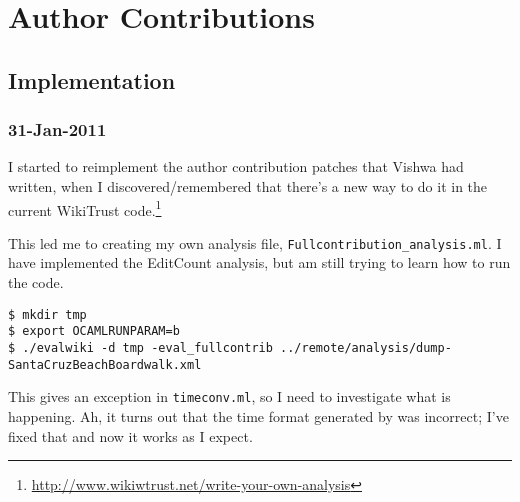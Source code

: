 \chapter{Author Contributions}

\section{Implementation}

\subsection{31-Jan-2011}

I started to reimplement the author contribution patches that
Vishwa had written, when I discovered/remembered that there's a
new way to do it in the current WikiTrust
code.\footnote{\url{http://www.wikiwtrust.net/write-your-own-analysis}}

This led me to creating my own analysis file,
\texttt{Fullcontribution\_analysis.ml}.
I have implemented the EditCount analysis, but am
still trying to learn how to run the code.
\begin{verbatim}
$ mkdir tmp
$ export OCAMLRUNPARAM=b
$ ./evalwiki -d tmp -eval_fullcontrib ../remote/analysis/dump-SantaCruzBeachBoardwalk.xml
\end{verbatim}
This gives an exception in \texttt{timeconv.ml}, so I need
to investigate what is happening.
Ah, it turns out that the time format generated by
 was incorrect; I've fixed that
and now it works as I expect.

